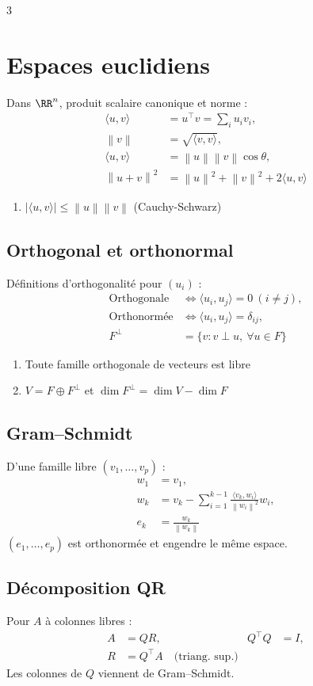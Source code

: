 \documentclass[12pt, a4paper]{article}
\newcommand{\norm}[1]{\left\lVert #1\right\rVert}
\begin{document}
\begin{multicols*}{3}
\colbreak

\section{Espaces euclidiens}
Dans $\RR^n$, produit scalaire canonique et norme :
\begin{align*}
\langle u,v\rangle&=u^\top v=\sum_i u_iv_i,\\
\norm{v}&=\sqrt{\langle v,v\rangle},\\
\langle u,v\rangle&=\norm{u}\norm{v}\cos\theta,\\
\norm{u+v}^2&=\norm u^2+\norm v^2+2\langle u,v\rangle
\end{align*}
\begin{enumerate}
\item $|\langle u,v\rangle|\le\norm u\norm v$ \hfill(Cauchy-Schwarz)
\end{enumerate}

\subsection{Orthogonal et orthonormal}
Définitions d'orthogonalité pour $(u_i)$ :
\begin{align*}
\text{Orthogonale}&\iff\langle u_i,u_j\rangle=0\ (i\ne j),\\
\text{Orthonormée}&\iff\langle u_i,u_j\rangle=\delta_{ij},\\
F^\perp&=\{v:v\perp u,\ \forall u\in F\}
\end{align*}
\begin{enumerate}
\item Toute famille orthogonale de vecteurs est libre
\item $V=F\oplus F^\perp$ et $\dim F^\perp=\dim V-\dim F$
\end{enumerate}

\subsection{Gram--Schmidt}
D'une famille libre $(v_1,\ldots,v_p)$ :
\begin{align*}
w_1&=v_1,\\
w_k&=v_k-\sum_{i=1}^{k-1}
\frac{\langle v_k,w_i\rangle}{\norm{w_i}^2}w_i,\\
e_k&=\frac{w_k}{\norm{w_k}}
\end{align*}
$(e_1,\ldots,e_p)$ est orthonormée et engendre le même espace.

\subsection{Décomposition QR}
Pour $A$ à colonnes libres :
\begin{align*}
A&=QR, &Q^\top Q&=I,\\
R&=Q^\top A\quad\text{(triang. sup.)}
\end{align*}
Les colonnes de $Q$ viennent de Gram--Schmidt.


\end{multicols*}
\end{document}
